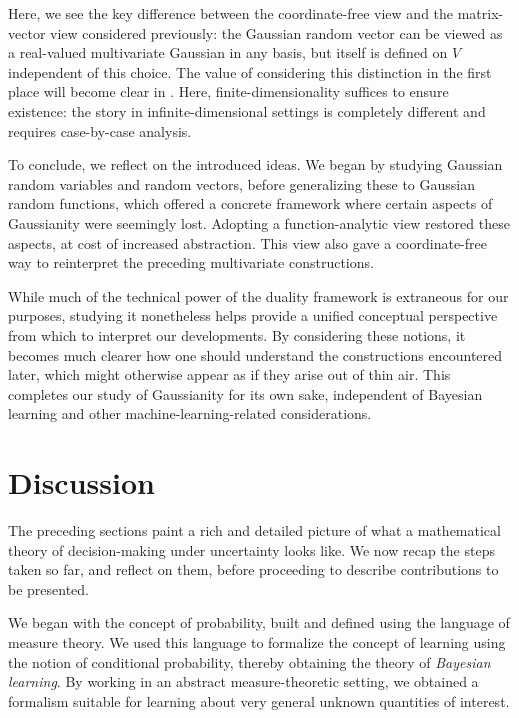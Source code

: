 \documentclass[11pt]{book}
\begin{document}
Here, we see the key difference between the coordinate-free view and the matrix-vector view considered previously: the Gaussian random vector can be viewed as a real-valued multivariate Gaussian in any basis, but itself is defined on $V$ independent of this choice.
The value of considering this distinction in the first place will become clear in .
Here, finite-dimensionality suffices to ensure existence: the story in infinite-dimensional settings is completely different and requires case-by-case analysis.

To conclude, we reflect on the introduced ideas. 
We began by studying Gaussian random variables and random vectors, before generalizing these to Gaussian random functions, which offered a concrete framework where certain aspects of Gaussianity were seemingly lost.
Adopting a function-analytic view restored these aspects, at cost of increased abstraction.
This view also gave a coordinate-free way to reinterpret the preceding multivariate constructions.

While much of the technical power of the duality framework is extraneous for our purposes, studying it nonetheless helps provide a unified conceptual perspective from which to interpret our developments.
By considering these notions, it becomes much clearer how one should understand the constructions encountered later, which might otherwise appear as if they arise out of thin air.
This completes our study of Gaussianity for its own sake, independent of Bayesian learning and other machine-learning-related considerations.

\section{Discussion}

The preceding sections paint a rich and detailed picture of what a mathematical theory of decision-making under uncertainty looks like.
We now recap the steps taken so far, and reflect on them, before proceeding to describe contributions to be presented.

We began with the concept of probability, built and defined using the language of measure theory. 
We used this language to formalize the concept of learning using the notion of conditional probability, thereby obtaining the theory of \emph{Bayesian learning}.
By working in an abstract measure-theoretic setting, we obtained a formalism suitable for learning about very general unknown quantities of interest.
\end{document}
